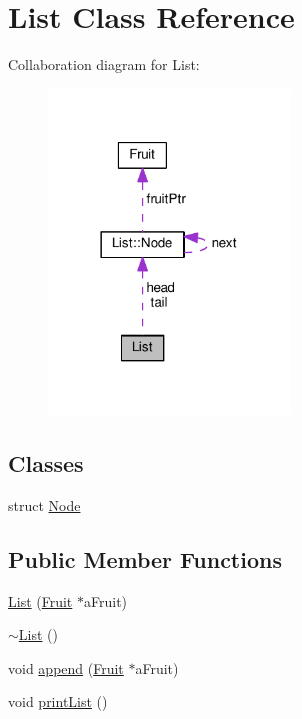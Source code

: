 \hypertarget{classList}{}\section{List Class Reference}
\label{classList}


Collaboration diagram for List\+:
\nopagebreak
\begin{figure}[H]
\begin{center}
\leavevmode
\includegraphics[width=182pt]{classList__coll__graph}
\end{center}
\end{figure}
\subsection*{Classes}
\begin{DoxyCompactItemize}
\item 
struct \hyperlink{structList_1_1Node}{Node}
\end{DoxyCompactItemize}
\subsection*{Public Member Functions}
\begin{DoxyCompactItemize}
\item 
\hyperlink{classList_a06e2fd0daed0264a70fb70194e7d93b6}{List} (\hyperlink{classFruit}{Fruit} $\ast$a\+Fruit)
\item 
\hyperlink{classList_a70aecf37bd9d779a394e4d50377fbf5f}{$\sim$\+List} ()
\item 
void \hyperlink{classList_aa38578a39e87e4b5d349d50e179dfa7a}{append} (\hyperlink{classFruit}{Fruit} $\ast$a\+Fruit)
\item 
void \hyperlink{classList_a1bb66c2777061ab3b8260746a8c3961e}{print\+List} ()
\end{DoxyCompactItemize}
